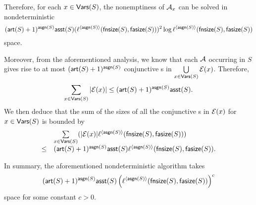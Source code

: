 Therefore, for each $x \in \mathsf{Vars}(S)$, 
the nonemptiness of $\mathcal{A}_x$ can be solved in nondeterministic 
{\small
$$(\mathsf{art}(S)+1)^{\mathsf{asgn}(S)}\mathsf{asst}(S)(\ell^{\langle \mathsf{asgn}(S) \rangle}(\mathsf{fnsize}(S), \mathsf{fasize}(S)))^2 \log \ell^{\langle \mathsf{asgn}(S) \rangle}(\mathsf{fnsize}(S), \mathsf{fasize}(S))$$
}
space.

Moreover, from the aforementioned analysis, we know that each \FA{} $\mathcal{A}$ occurring in $S$ gives rise to at most $(\mathsf{art}(S)+1)^{\mathsf{asgn}(S)}$ conjunctive \FA{}s in $\bigcup \limits_{x \in \mathsf{Vars}(S)} \mathcal{E}(x)$. Therefore, 
$$\sum \limits_{x \in \mathsf{Vars}(S)} |\mathcal{E}(x)| \le (\mathsf{art}(S)+1)^{\mathsf{asgn}(S)} \mathsf{asst}(S).$$
We then deduce that the sum of the sizes of all the conjunctive \FA{}s in $\mathcal{E}(x)$ for $x \in \mathsf{Vars}(S)$ is bounded by 
$$
\begin{array}{l l}
& \sum \limits_{x \in \mathsf{Vars}(S)} (|\mathcal{E}(x)| \ell^{\langle \mathsf{asgn}(S) \rangle}(\mathsf{fnsize}(S), \mathsf{fasize}(S)))  \\
\le & (\mathsf{art}(S)+1)^{\mathsf{asgn}(S)}\mathsf{asst}(S) \ell^{\langle \mathsf{asgn}(S) \rangle}(\mathsf{fnsize}(S), \mathsf{fasize}(S)) .
\end{array}
$$

In summary, the aforementioned nondeterministic algorithm takes 
$$(\mathsf{art}(S)+1)^{\mathsf{asgn}(S)}  \mathsf{asst}(S) \left(\ell^{\langle \mathsf{asgn}(S) \rangle}(\mathsf{fnsize}(S), \mathsf{fasize}(S)) \right)^c$$
 space for some constant $c > 0$.
